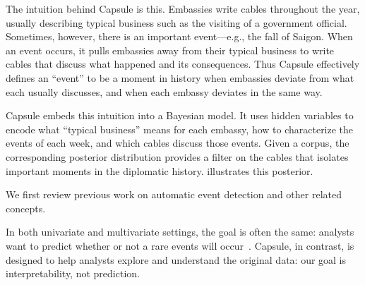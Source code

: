 The intuition behind Capsule is this. Embassies write cables
throughout the year, usually describing typical business such as the
visiting of a government official. Sometimes, however, there is an
important event---e.g., the fall of Saigon. When an event occurs, it
pulls embassies away from their typical business to write cables that
discuss what happened and its consequences. Thus Capsule effectively
defines an ``event'' to be a moment in history when embassies deviate
from what each usually discusses, and when each embassy deviates in
the same way.

Capsule embeds this intuition into a Bayesian model. It uses hidden
variables to encode what ``typical business'' means for each embassy,
how to characterize the events of each week, and which cables discuss
those events. Given a corpus, the corresponding posterior distribution
provides a filter on the cables that isolates important moments in the
diplomatic history.  illustrates this
posterior.



 We first review previous work on automatic
event detection and other related concepts.

In both univariate and multivariate settings, the goal is often the same: analysts want to predict whether or not a rare events will occur~\cite{weiss1998learning,das2008anomaly}.  Capsule, in contrast, is designed to help analysts explore and understand the original data: our goal is interpretability, not prediction.

